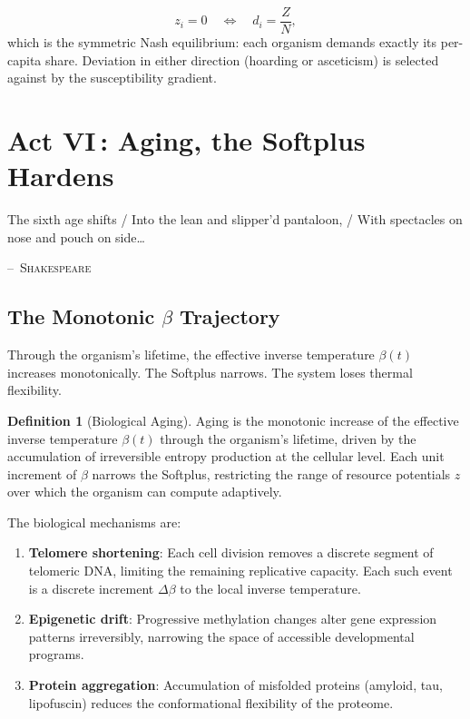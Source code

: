 \documentclass[12pt, letterpaper]{article}
\theoremstyle{plain}
\theoremstyle{definition}
\newtheorem{definition}[theorem]{Definition}
\theoremstyle{remark}
\begin{document}
\begin{equation}
  z_i = 0 \quad\iff\quad d_i = \frac{Z}{N},
\end{equation}
which is the symmetric Nash equilibrium: each organism demands exactly its per-capita share. Deviation in either direction (hoarding or asceticism) is selected against by the susceptibility gradient.


\section{\texorpdfstring{Act VI\,: Aging, the Softplus Hardens}{Act VI: Aging, the Softplus Hardens}}
\label{sec:act6}

\epigraph{The sixth age shifts / Into the lean and slipper'd pantaloon, / With spectacles on nose and pouch on side\ldots}{\textsc{--~Shakespeare}}

\subsection{The Monotonic \texorpdfstring{$\beta$}{beta} Trajectory}

Through the organism's lifetime, the effective inverse temperature $\beta(t)$ increases monotonically. The Softplus narrows. The system loses thermal flexibility.

\begin{definition}[Biological Aging]\label{def:aging}
  Aging is the monotonic increase of the effective inverse temperature $\beta(t)$ through the organism's lifetime, driven by the accumulation of irreversible entropy production at the cellular level. Each unit increment of $\beta$ narrows the Softplus, restricting the range of resource potentials $z$ over which the organism can compute adaptively.
\end{definition}

The biological mechanisms are:
\begin{enumerate}[label=(\roman*)]
  \item \textbf{Telomere shortening}: Each cell division removes a discrete segment of telomeric DNA, limiting the remaining replicative capacity. Each such event is a discrete increment $\Delta\beta$ to the local inverse temperature.
  \item \textbf{Epigenetic drift}: Progressive methylation changes alter gene expression patterns irreversibly, narrowing the space of accessible developmental programs.
  \item \textbf{Protein aggregation}: Accumulation of misfolded proteins (amyloid, tau, lipofuscin) reduces the conformational flexibility of the proteome.
\end{enumerate}
\end{document}
